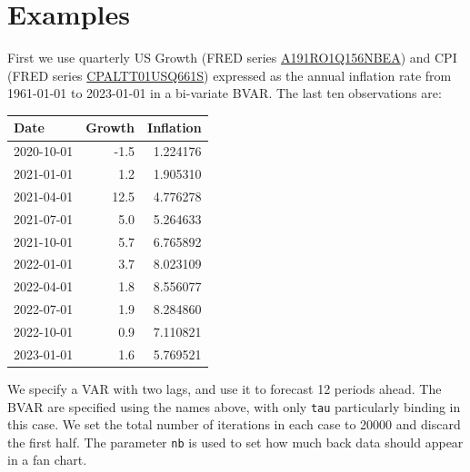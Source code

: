 \documentclass[
  letterpaper,
]{book}
\begin{document}
\hypertarget{examples}{%
\section{Examples}\label{examples}}

First we use quarterly US Growth (FRED series
\href{https://fred.stlouisfed.org/series/A191RO1Q156NBEA}{A191RO1Q156NBEA})
and CPI (FRED series
\href{https://fred.stlouisfed.org/series/CPALTT01USQ661S}{CPALTT01USQ661S})
expressed as the annual inflation rate from 1961-01-01 to 2023-01-01 in
a bi-variate BVAR. The last ten observations are:

\begin{longtable}[]{@{}lrr@{}}
\toprule()
Date & Growth & Inflation \\
\midrule()
\endhead
2020-10-01 & -1.5 & 1.224176 \\
2021-01-01 & 1.2 & 1.905310 \\
2021-04-01 & 12.5 & 4.776278 \\
2021-07-01 & 5.0 & 5.264633 \\
2021-10-01 & 5.7 & 6.765892 \\
2022-01-01 & 3.7 & 8.023109 \\
2022-04-01 & 1.8 & 8.556077 \\
2022-07-01 & 1.9 & 8.284860 \\
2022-10-01 & 0.9 & 7.110821 \\
2023-01-01 & 1.6 & 5.769521 \\
\bottomrule()
\end{longtable}

We specify a VAR with two lags, and use it to forecast 12 periods ahead.
The BVAR are specified using the names above, with only \texttt{tau}
particularly binding in this case. We set the total number of iterations
in each case to 20000 and discard the first half. The parameter
\texttt{nb} is used to set how much back data should appear in a fan
chart.
\end{document}
